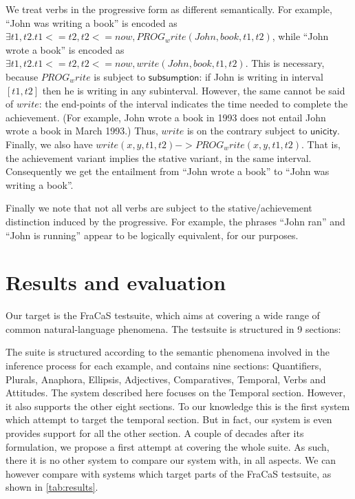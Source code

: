 \documentclass[a4paper,11pt]{article}
\newcommand\constant[1]{\mathsf{#1}}
\begin{document}
We treat verbs in the progressive form as different semantically. For
example, ``John was writing a book'' is encoded as
$∃t1, t2. t1<= t2, t2 <= now, PROG_write(John,book,t1,t2)$, while
``John wrote a book'' is encoded as
$∃t1, t2. t1<= t2, t2 <= now, write(John,book,t1,t2)$. This is
necessary, because $PROG_write$ is subject to
$\constant{subsumption}$: if John is writing in interval $[t1,t2]$
then he is writing in any subinterval. However, the same cannot be
said of $write$: the end-points of the interval indicates the time
needed to complete the achievement. (For example, John wrote a book in
1993 does not entail John wrote a book in March 1993.) Thus, $write$
is on the contrary subject to $\constant{unicity}$. Finally, we also
have $write(x,y,t1,t2) -> PROG_write(x,y,t1,t2)$. That is, the
achievement variant implies the stative variant, in the same interval.
Consequently we get the entailment from ``John wrote a book'' to
``John was writing a book''.

Finally we note that not all verbs are subject to the
stative/achievement distinction induced by the progressive. For
example, the phrases ``John ran'' and ``John is running'' appear to be
logically equivalent, for our purposes.

\section{Results and evaluation}
Our target is the FraCaS testsuite, which aims at covering a wide
range of common natural-language phenomena. The testsuite is structured in 9 sections:


The suite is structured according to the semantic phenomena involved
in the inference process for each example, and contains nine sections:
Quantifiers, Plurals, Anaphora, Ellipsis, Adjectives, Comparatives,
Temporal, Verbs and Attitudes.  The system described here focuses on
the Temporal section. However, it also supports the other eight
sections.  To our knowledge this is the first system which attempt to
target the temporal section. But in fact, our system is even provides
support for all the other section. A couple of decades after its
formulation, we propose a first attempt at covering the whole suite.
As such, there it is no other system to compare our system with, in
all aspects.  We can however compare with systems which target parts
of the FraCaS testsuite, as shown in \cref{tab:results}.
\end{document}
